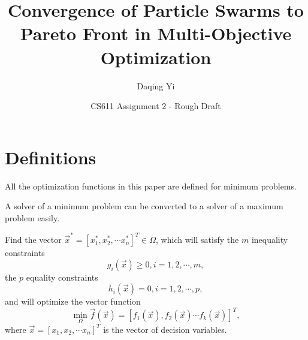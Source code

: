 \documentclass[12pt]{article}
\begin{document}
\title{\textsf{Convergence of Particle Swarms to Pareto Front in Multi-Objective Optimization}}
\author{\textsf{Daqing Yi}}
\date{\textsf{CS611 Assignment 2 - Rough Draft}}

\maketitle



\section{Definitions}

\begin{prop}
All the optimization functions in this paper are defined for minimum problems.
\end{prop}
A solver of a minimum problem can be converted to a solver of a maximum problem easily.

\begin{mydef}
\label{def:multi_opt}
Find the vector $ \vec{x}^{*} = \left[ {x}_{1}^{*}, {x}_{2}^{*}, \cdots {x}_{n}^{*} \right]^{T} \in \Omega $, which will satisfy the $ m $ inequality constraints
\begin{equation}
\label{eq:mo_ineq_constraint}
g_{i}(\vec{x}) \geq 0, i = 1, 2, \cdots , m, 
\end{equation}
the $ p $ equality constraints
\begin{equation}
\label{eq:mo_eq_constraint}
h_{i}(\vec{x}) = 0, i = 1, 2, \cdots , p, 
\end{equation}
and will optimize the vector function
\begin{equation}
\label{eq:mo_obj}
\min_{\Omega} \vec{f}(\vec{x}) = \left[ f_{1}(\vec{x}), f_{2}(\vec{x}) \cdots f_{k}(\vec{x}) \right]^{T},
\end{equation}
where $ \vec{x} = \left[ x_{1}, x_{2}, \cdots x_{n} \right]^{T} $ is the vector of decision variables.
\end{mydef}
\end{document}
